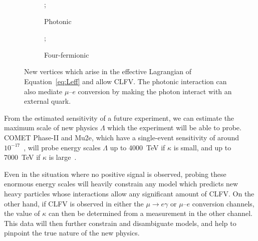 \begin{figure}
    \centering
    \begin{subfigure}[b]{0.3\textwidth}
        \centering
        ;
        \caption{Photonic}
    \end{subfigure}
    \hspace{1cm}
    \begin{subfigure}[b]{0.3\textwidth}
        \centering
        ;
        \caption{Four-fermionic}
    \end{subfigure}
    \caption{New vertices which arise in the effective Lagrangian of
    Equation~\ref{eq:Leff} and allow CLFV. The photonic interaction can also mediate
    $\mu$--$e$ conversion by making the photon interact with an external quark.}
    \label{fig:tree_lvl_clfv}
\end{figure}

From the estimated sensitivity of a future experiment, we can estimate the
maximum scale of new physics $\Lambda$ which the experiment will be able to
probe. COMET Phase-II and Mu2e, which have a single-event sensitivity of around
$10^{-17}$~\cite{the_comet_collaboration_comet_2020, bartoszek2015mu2e}, will
probe energy scales $\Lambda$ up to \SI{4000}{\tera\eV} if $\kappa$ is small, and up to
\SI{7000}{\tera\eV} if $\kappa$ is large~\cite{ben_thesis, ewen_thesis}. 

Even in the situation where no positive signal is observed, probing these enormous
energy scales will heavily constrain any model which predicts new heavy
particles whose interactions allow any significant amount of CLFV. On the other
hand, if CLFV is observed in either the $\mu\rightarrow e\gamma$ or $\mu$--$e$
conversion channels, the value of $\kappa$ can then be determined from a
measurement in the other channel. This data will then further constrain and
disambiguate models, and help to pinpoint the true nature of the new physics.
